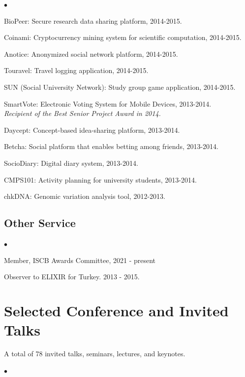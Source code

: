 \documentclass[margin,line]{res}
\newenvironment{list2}{
  \begin{list}{$\bullet$}{%
      \setlength{\itemsep}{0.1cm}
      \setlength{\parsep}{0in} \setlength{\parskip}{0in}
      \setlength{\topsep}{0in} \setlength{\partopsep}{0in} 
      \setlength{\leftmargin}{0.2in}}}{\end{list}}
\begin{document}
\begin{resume}
\begin{list2}
  \item BioPeer: Secure research data sharing platform, 2014-2015.
  \item Coinami: Cryptocurrency mining system for scientific computation, 2014-2015.
  \item Anotice: Anonymized social network platform, 2014-2015.
  \item Touravel: Travel logging application, 2014-2015. 
  \item SUN (Social University Network): Study group game application, 2014-2015.
  \item SmartVote: Electronic Voting System for Mobile Devices, 2013-2014. \\
    {\it Recipient of the Best Senior Project Award in 2014.}
  \item Daycept: Concept-based idea-sharing platform, 2013-2014.
  \item Betcha: Social platform that enables betting among friends, 2013-2014.%
  \item SocioDiary: Digital diary system, 2013-2014.
  \item CMPS101: Activity planning for university students, 2013-2014.
  \item chkDNA: Genomic variation analysis tool, 2012-2013.
\end{list2}


\vspace{-0.4cm}
\subsection{\small \sc Other Service}
\begin{list2}
    \item 
        Member, ISCB Awards Committee, 2021 - present
    \item
        Observer to ELIXIR for Turkey. 2013 - 2015.
\end{list2}

\vspace*{-.2cm}
\section{\sc Selected Conference and Invited Talks}
{\small
A total of 78 invited talks, seminars, lectures, and keynotes.
}\\

\begin{list2}


\end{list2}
\end{resume}
\end{document}
